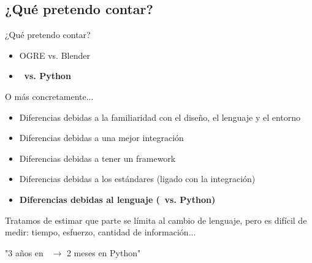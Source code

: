 \subsection{¿Qué pretendo contar?}
\begin{frame}{¿Qué pretendo contar?}
	\begin{itemize}
		\item OGRE vs. Blender
		\item \textbf{\CC $\,$ vs. Python}
	\end{itemize}
	\pause
	O más concretamente...
	\begin{itemize}
		\item Diferencias debidas a la familiaridad con el diseño,
		el lenguaje y el entorno
		\item Diferencias debidas a una mejor integración
		\item Diferencias debidas a tener un framework
		\item Diferencias debidas a los estándares (ligado con la integración)
		\item \textbf{Diferencias debidas al lenguaje (\CC $\,$ vs. Python)}
	\end{itemize}

	\vspace{0.3cm}

	\begin{center}
		Tratamos de estimar que parte se límita al cambio de lenguaje,
		pero es difícil de medir: tiempo, esfuerzo, cantidad de información...
		
		"3 años en \CC $\,$ $\rightarrow$ 2 meses en Python"
	\end{center}
\end{frame}

